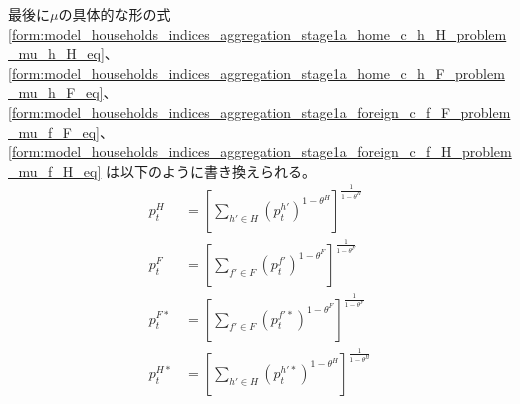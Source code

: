 最後に\(\mu\)の具体的な形の式
\eqref{form:model_households_indices_aggregation_stage1a_home_c_h_H_problem_mu_h_H_eq}、
\eqref{form:model_households_indices_aggregation_stage1a_home_c_h_F_problem_mu_h_F_eq}、
\eqref{form:model_households_indices_aggregation_stage1a_foreign_c_f_F_problem_mu_f_F_eq}、
\eqref{form:model_households_indices_aggregation_stage1a_foreign_c_f_H_problem_mu_f_H_eq}
は以下のように書き換えられる。
\begin{align}
    \label{form:model_households_indices_aggregation_stage1a_ppi_descriptions_p_H_eq}
        p_t^H&=\left[\sum_{h'\in H}(p_t^{h'})^{1-\theta^H}\right]^{\frac{1}{1-\theta^H}} \\
    \label{form:model_households_indices_aggregation_stage1a_ppi_descriptions_p_F_eq}
        p_t^F&=\left[\sum_{f'\in F}(p_t^{f'})^{1-\theta^F}\right]^{\frac{1}{1-\theta^F}} \\
    \label{form:model_households_indices_aggregation_stage1a_ppi_descriptions_p_F_star_eq}
        p_t^{F*}&=\left[\sum_{f'\in F}(p_t^{f'*})^{1-\theta^F}\right]^{\frac{1}{1-\theta^F}} \\
    \label{form:model_households_indices_aggregation_stage1a_ppi_descriptions_p_H_star_eq}
        p_t^{H*}&=\left[\sum_{h'\in H}(p_t^{h'*})^{1-\theta^H}\right]^{\frac{1}{1-\theta^H}}
\end{align}